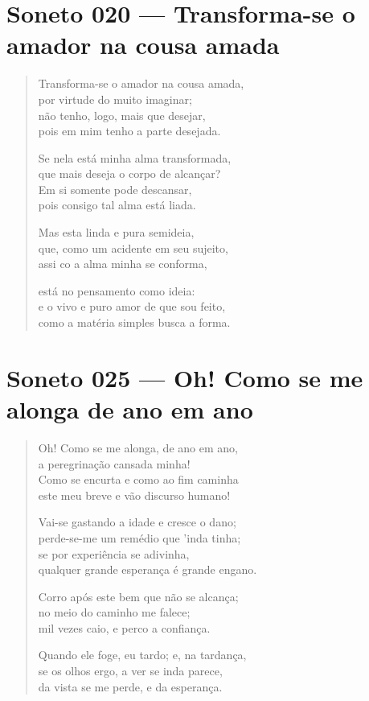 \documentclass[10pt,a5paper,oneside]{book}
\begin{document}
\chapter{Soneto 020 --- Transforma-se o amador na cousa amada}

\begin{verse}
Transforma-se o amador na cousa amada,\\
por virtude do muito imaginar;\\
não tenho, logo, mais que desejar,\\
pois em mim tenho a parte desejada.

Se nela está minha alma transformada,\\
que mais deseja o corpo de alcançar?\\
Em si somente pode descansar,\\
pois consigo tal alma está liada.

Mas esta linda e pura semideia,\\
que, como um acidente em seu sujeito,\\
assi co a alma minha se conforma,

está no pensamento como ideia:\\
e o vivo e puro amor de que sou feito,\\
como a matéria simples busca a forma.
\end{verse}

\chapter{Soneto 025 --- Oh! Como se me alonga de ano em ano}

\begin{verse}
Oh! Como se me alonga, de ano em ano,\\
a peregrinação cansada minha!\\
Como se encurta e como ao fim caminha\\
este meu breve e vão discurso humano!

Vai-se gastando a idade e cresce o dano;\\
perde-se-me um remédio que 'inda tinha;\\
se por experiência se adivinha,\\
qualquer grande esperança é grande engano.

Corro após este bem que não se alcança;\\
no meio do caminho me falece;\\
mil vezes caio, e perco a confiança.

Quando ele foge, eu tardo; e, na tardança,\\
se os olhos ergo, a ver se inda parece,\\
da vista se me perde, e da esperança.
\end{verse}
\end{document}
